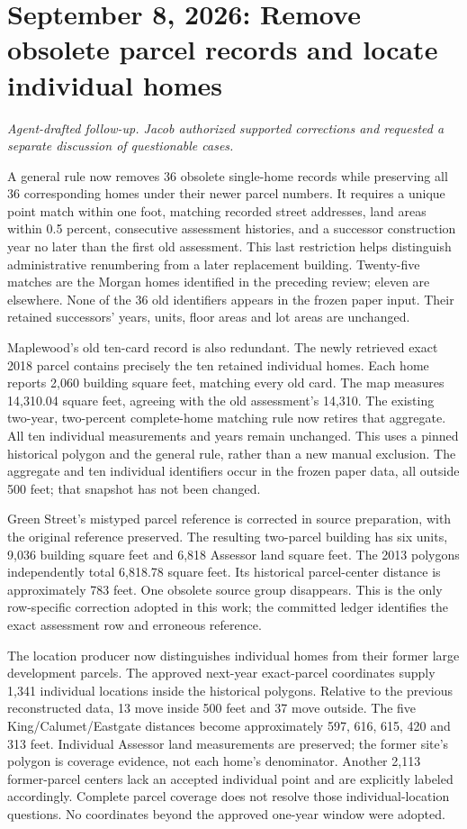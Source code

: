 \section*{September 8, 2026: Remove obsolete parcel records and locate individual homes}
\textit{Agent-drafted follow-up. Jacob authorized supported corrections and requested a separate discussion of questionable cases.}

A general rule now removes 36 obsolete single-home records while preserving
all 36 corresponding homes under their newer parcel numbers. It requires a
unique point match within one foot, matching recorded street addresses,
land areas within 0.5 percent, consecutive assessment histories, and a successor
construction year no later than the first old assessment. This last restriction
helps distinguish administrative renumbering from a later replacement building.
Twenty-five matches are the Morgan homes identified in the preceding review;
eleven are elsewhere. None of the 36 old identifiers appears in the frozen
paper input. Their retained successors' years, units, floor areas and lot areas
are unchanged.

Maplewood's old ten-card record is also redundant. The newly retrieved exact
2018 parcel contains precisely the ten retained individual homes. Each home
reports 2,060 building square feet, matching every old card. The map measures
14,310.04 square feet, agreeing with the old assessment's 14,310. The existing
two-year, two-percent complete-home matching rule now retires that aggregate.
All ten individual measurements and years remain unchanged. This uses a pinned
historical polygon and the general rule, rather than a new manual exclusion.
The aggregate and ten individual identifiers occur in the frozen paper data,
all outside 500 feet; that snapshot has not been changed.

Green Street's mistyped parcel reference is corrected in source preparation,
with the original reference preserved. The resulting two-parcel building has
six units, 9,036 building square feet and 6,818 Assessor land square feet.
The 2013 polygons independently total 6,818.78 square feet. Its historical
parcel-center distance is approximately 783 feet. One obsolete source group
disappears. This is the only row-specific correction adopted in this work;
the committed ledger identifies the exact assessment row and erroneous reference.

The location producer now distinguishes individual homes from their former
large development parcels. The approved next-year exact-parcel coordinates
supply 1,341 individual locations inside the historical polygons. Relative to
the previous reconstructed data, 13 move inside 500 feet and 37 move outside.
The five King/Calumet/Eastgate distances become approximately 597, 616, 615,
420 and 313 feet. Individual Assessor land measurements are preserved; the
former site's polygon is coverage evidence, not each home's denominator.
Another 2,113 former-parcel centers lack an accepted individual point and are
explicitly labeled accordingly. Complete parcel coverage does not resolve those
individual-location questions. No coordinates beyond the approved one-year
window were adopted.

